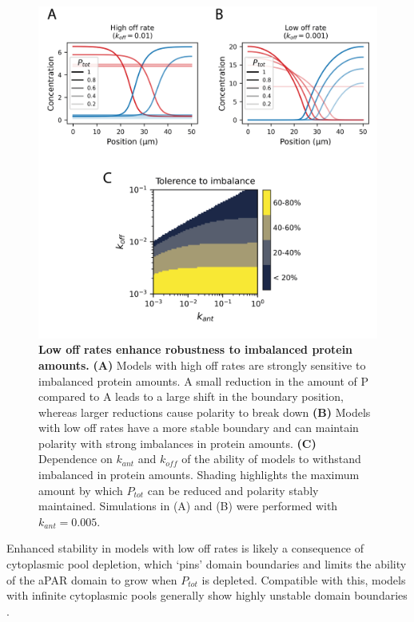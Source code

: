 \documentclass[12pt]{"report"}
\newcommand{\mycaption}[2]{\caption[#1]{\textbf{#1.} #2}}
\begin{document}
\begin{figure}
\includegraphics[scale=1]{goehring_model_kant_koff_dosage_imbalance}
\centering
\mycaption{Low off rates enhance robustness to imbalanced protein amounts}{
\textbf{(A)} Models with high off rates are strongly sensitive to imbalanced protein amounts. A small reduction in the amount of P compared to A leads to a large shift in the boundary position, whereas larger reductions cause polarity to break down
\textbf{(B)} Models with low off rates have a more stable boundary and can maintain polarity with strong imbalances in protein amounts. 
\textbf{(C)} Dependence on $k_{ant}$ and $k_{off}$ of the ability of models to withstand imbalanced in protein amounts. Shading highlights the maximum amount by which $P_{tot}$ can be reduced and polarity stably maintained. Simulations in (A) and (B) were performed with $k_{ant} = 0.005$.
}
\label{fig:goehring_model_kant_koff_dosage_imbalance}
\end{figure}

Enhanced stability in models with low off rates is likely a consequence of cytoplasmic pool depletion, which `pins' domain boundaries and limits the ability of the aPAR domain to grow when $P_{tot}$ is depleted. Compatible with this, models with infinite cytoplasmic pools generally show highly unstable domain boundaries \citep{Dawes2011}.\\
\end{document}

